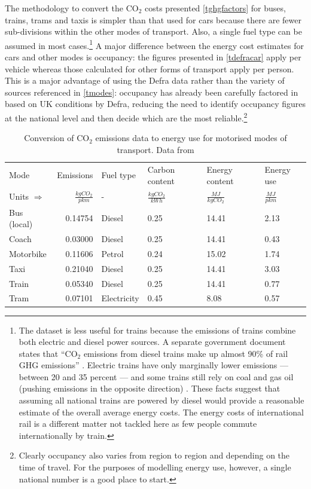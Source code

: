 The methodology to convert the CO$_2$ costs presented \cref{tghgfactors} for
buses, trains, trams and taxis is simpler
than that used for cars because there are fewer sub-divisions within the other
modes of transport.
Also, a single fuel type can be assumed in most cases.\footnote{The
dataset is less useful for trains because the emissions of trains combine
both electric and diesel power sources. A separate government document
states that ``CO$_2$
emissions from diesel trains make up almost 90\% of rail GHG emissions''
\citep[p.~13]{DfT2011-train90}. Electric trains have only marginally
lower emissions --- between 20 and 35 percent \citep{Hickman2012-trains} ---
and some trains still rely on coal and gas oil (pushing emissions in
the opposite direction) \citep{DfT2011-train90}. These facts suggest that
assuming all national trains are powered by diesel would provide a reasonable estimate
of the overall average energy costs.
The energy costs of international rail is a different matter not tackled here
as few people commute internationally by train.
}
A major difference between the energy cost estimates for cars and other
modes is occupancy: the figures presented in \cref{tdefracar} apply per vehicle
whereas those calculated for other forms of transport apply per person.
This is a major advantage of using the Defra data rather than the variety of
sources referenced in \cref{tmodes}: occupancy has already been carefully
factored in based on UK conditions by Defra, reducing the need to identify
occupancy figures at the national level and then decide which are the most
reliable.\footnote{Clearly
occupancy also varies from region to region and depending on the
time of travel. For the purposes of modelling energy use, however,
a single national number is a good place to start.
}

\begin{table}[htbp]
\caption[Emissions data and calculated energy use of motorised
modes]{Conversion of CO$_2$ emissions data to energy use for motorised
modes of transport. Data from \citep{Defra2011}}
\begin{center}
\begin{tabular}{lrlp{1.8cm}p{1.8cm}p{1.8cm}}
\toprule
Mode & Emissions & Fuel type & Carbon content & Energy content & Energy use \\
Units $\Rightarrow$ & $\frac{kg CO_2}{pkm}$ & - & $\frac{kg CO_2}{kWh}$ &$\frac{MJ}{kg CO_2}$ &
$\frac{MJ}{pkm}$ \\
\midrule
Bus (local) & 0.14754 & Diesel & 0.25 & 14.41 & 2.13 \\
Coach	& 0.03000 & Diesel &	0.25	& 14.41 &	0.43\\
Motorbike & 0.11606 & Petrol & 0.24 & 15.02 & 1.74 \\
Taxi & 0.21040 & Diesel & 0.25 & 14.41 & 3.03 \\
Train  & 0.05340 & Diesel & 0.25 & 14.41 & 0.77 \\
Tram & 0.07101 & Electricity  & 0.45 & 8.08 & 0.57 \\
\bottomrule
\end{tabular}\end{center}
\label{tdefra2}
\end{table}

